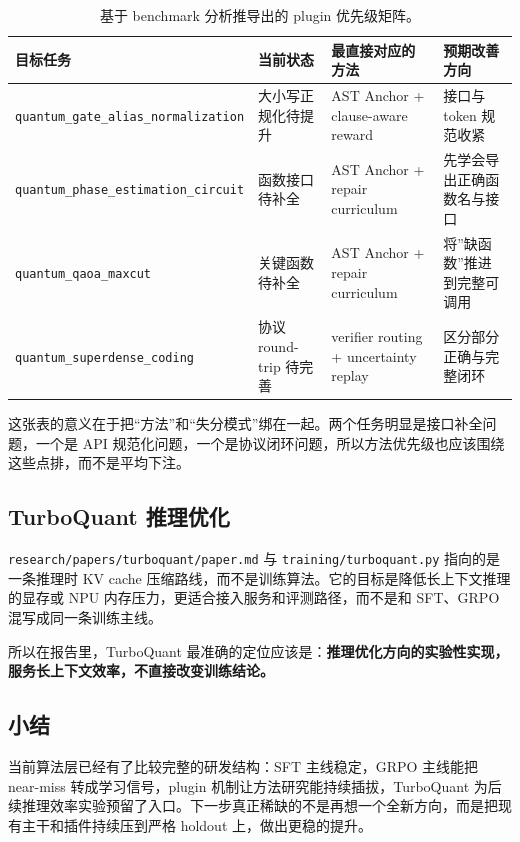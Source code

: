 \documentclass[11pt,a4paper]{article}
\newcommand{\code}[1]{\begingroup\ttfamily\footnotesize\nolinkurl{#1}\endgroup}
\begin{document}
\begin{table}[htbp]
\centering
\small
\begin{tabularx}{\textwidth}{p{3.0cm} p{2.3cm} p{3.0cm} Y}
\toprule
目标任务 & 当前状态 & 最直接对应的方法 & 预期改善方向 \\
\midrule
\code{quantum\_gate\_alias\_normalization} & 大小写正规化待提升 & AST Anchor + clause-aware reward & 接口与 token 规范收紧 \\
\code{quantum\_phase\_estimation\_circuit} & 函数接口待补全 & AST Anchor + repair curriculum & 先学会导出正确函数名与接口 \\
\code{quantum\_qaoa\_maxcut} & 关键函数待补全 & AST Anchor + repair curriculum & 将”缺函数”推进到完整可调用 \\
\code{quantum\_superdense\_coding} & 协议 round-trip 待完善 & verifier routing + uncertainty replay & 区分部分正确与完整闭环 \\
\bottomrule
\end{tabularx}
\caption{基于 benchmark 分析推导出的 plugin 优先级矩阵。}
\label{tab:failure-to-method}
\end{table}

这张表的意义在于把“方法”和“失分模式”绑在一起。两个任务明显是接口补全问题，一个是 API 规范化问题，一个是协议闭环问题，所以方法优先级也应该围绕这些点排，而不是平均下注。

\subsection{TurboQuant 推理优化}

\code{research/papers/turboquant/paper.md} 与 \code{training/turboquant.py} 指向的是一条推理时 KV cache 压缩路线，而不是训练算法。它的目标是降低长上下文推理的显存或 NPU 内存压力，更适合接入服务和评测路径，而不是和 SFT、GRPO 混写成同一条训练主线。

所以在报告里，TurboQuant 最准确的定位应该是：\textbf{推理优化方向的实验性实现，服务长上下文效率，不直接改变训练结论。}

\subsection{小结}

当前算法层已经有了比较完整的研发结构：SFT 主线稳定，GRPO 主线能把 near-miss 转成学习信号，plugin 机制让方法研究能持续插拔，TurboQuant 为后续推理效率实验预留了入口。下一步真正稀缺的不是再想一个全新方向，而是把现有主干和插件持续压到严格 holdout 上，做出更稳的提升。
\end{document}
